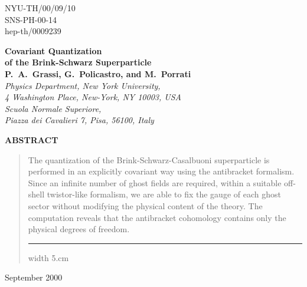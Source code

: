 \documentclass[a4paper,12pt]{article}
\begin{document}
\begin{titlepage}
\begin{flushright}
NYU-TH/00/09/10 \\
SNS-PH-00-14 \\
hep-th/0009239
\end{flushright}
\vfill
\begin{center}
{\LARGE\bf Covariant Quantization \\ of the Brink-Schwarz Superparticle}    \\
  \large
{\bf  P.~A.~Grassi\coordHE{}, G.~Policastro\coordHE{},  and  M.~Porrati\coordHE{}}\\
\vfill
{\small \it
{}\coordHE{}Physics Department,  New York University, \\ 
4 Washington Place, New-York,  NY 10003,  USA \\ 
\vspace{.2cm}
\coordHE{} Scuola Normale Superiore, \\
Piazza dei Cavalieri  7, Pisa, 56100, Italy \\}
\end{center}
\vfill

\begin{center}
{\bf ABSTRACT}
\end{center}
\begin{quote}
  The quantization of the Brink-Schwarz-Casalbuoni superparticle is
  performed in an explicitly covariant way using the antibracket
  formalism.  Since an infinite number of ghost fields are required,
  within a suitable off-shell twistor-like formalism, we are able to
  fix the gauge of each ghost sector without modifying the physical
  content of the theory. The computation reveals that the antibracket
  cohomology contains only the physical degrees of freedom.  \vfill
  \hrule width 5.cm 
\end{quote}
\begin{flushleft}
September 2000
\end{flushleft}
\end{titlepage}


\providecommand{\note}[1]{{\tiny (note)}\marginpar {\scriptsize #1}}
\renewcommand{\thefootnote}{\fnsymbol{footnote}}
\providecommand{\ghe}[2]{\myHighlight{$\stackrel{\textstyle #1}{\scriptstyle (#2)}$}\coordHE{}}
\providecommand{\lre}{\multicolumn{3}{c}{\myHighlight{$\stackrel{*}{\longleftrightarrow}$}\coordHE{}}} 
\end{document}
